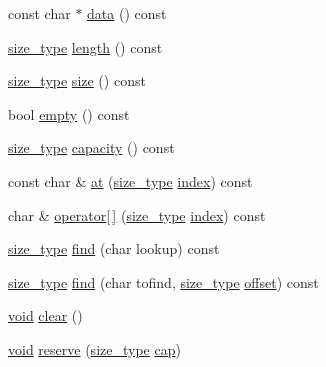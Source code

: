 \begin{DoxyCompactItemize}
\item 
const char $\ast$ \hyperlink{class_ti_xml_string_a00abc60f135c7ca1951c7334cc2c7993}{data} () const 
\item 
\hyperlink{class_ti_xml_string_abeb2c1893a04c17904f7c06546d0b971}{size\-\_\-type} \hyperlink{class_ti_xml_string_a3202f27d139a3fac79205f1f3c707727}{length} () const 
\item 
\hyperlink{class_ti_xml_string_abeb2c1893a04c17904f7c06546d0b971}{size\-\_\-type} \hyperlink{class_ti_xml_string_a96103e5c0f67e987fa48527e1f47a1f6}{size} () const 
\item 
bool \hyperlink{class_ti_xml_string_a9a61e1d11cdb71bea4a4ed79caa793f4}{empty} () const 
\item 
\hyperlink{class_ti_xml_string_abeb2c1893a04c17904f7c06546d0b971}{size\-\_\-type} \hyperlink{class_ti_xml_string_a76e4d6aba7845f4cf9c02332a5fbf916}{capacity} () const 
\item 
const char \& \hyperlink{class_ti_xml_string_a6763093267bbdecbf03f8840bc349877}{at} (\hyperlink{class_ti_xml_string_abeb2c1893a04c17904f7c06546d0b971}{size\-\_\-type} \hyperlink{fmod__codec_8h_a57f14e05b1900f16a2da82ade47d0c6d}{index}) const 
\item 
char \& \hyperlink{class_ti_xml_string_ae8cdc1d46c538536b786f7ae03c0c1d9}{operator\mbox{[}$\,$\mbox{]}} (\hyperlink{class_ti_xml_string_abeb2c1893a04c17904f7c06546d0b971}{size\-\_\-type} \hyperlink{fmod__codec_8h_a57f14e05b1900f16a2da82ade47d0c6d}{index}) const 
\item 
\hyperlink{class_ti_xml_string_abeb2c1893a04c17904f7c06546d0b971}{size\-\_\-type} \hyperlink{class_ti_xml_string_a5c2b368b5eafe075fd9565cbcbd4c2f9}{find} (char lookup) const 
\item 
\hyperlink{class_ti_xml_string_abeb2c1893a04c17904f7c06546d0b971}{size\-\_\-type} \hyperlink{class_ti_xml_string_a5f2a6fd565751410b392f249a9786db4}{find} (char tofind, \hyperlink{class_ti_xml_string_abeb2c1893a04c17904f7c06546d0b971}{size\-\_\-type} \hyperlink{fmod__output_8h_ac915cd848f42b26af51745f204a3b9af}{offset}) const 
\item 
\hyperlink{wglew_8h_aeea6e3dfae3acf232096f57d2d57f084}{void} \hyperlink{class_ti_xml_string_ab20e06e4c666abf3bdbfb3a1191d4888}{clear} ()
\item 
\hyperlink{wglew_8h_aeea6e3dfae3acf232096f57d2d57f084}{void} \hyperlink{class_ti_xml_string_a88ecf9f0f00cb5c67b6b637958d7049c}{reserve} (\hyperlink{class_ti_xml_string_abeb2c1893a04c17904f7c06546d0b971}{size\-\_\-type} \hyperlink{glew_8h_ae22de5a430ce81d57d8140824a3e10dc}{cap})

\end{DoxyCompactItemize}
